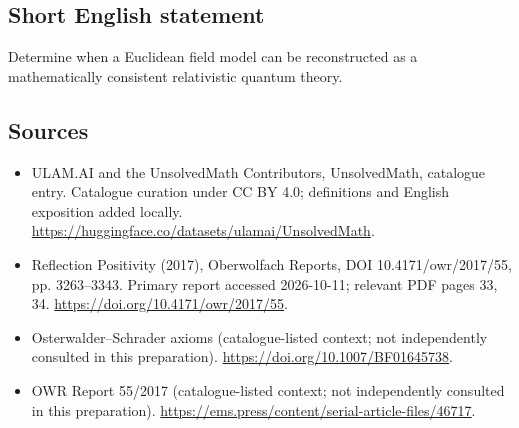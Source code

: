 \documentclass[11pt]{article}
\begin{document}
\subsection{Short English statement}
Determine when a Euclidean field model can be reconstructed as a mathematically consistent relativistic quantum theory.
\subsection{Sources}
\begin{itemize}
\item[\hypertarget{source:statement:1}{S1}] ULAM.AI and the UnsolvedMath Contributors, UnsolvedMath, catalogue entry. Catalogue curation under CC BY 4.0; definitions and English exposition added locally.
\url{https://huggingface.co/datasets/ulamai/UnsolvedMath}.
\item[\hypertarget{source:statement:2}{S2}] Reflection Positivity (2017), Oberwolfach Reports, DOI 10.4171/owr/2017/55, pp. 3263--3343. Primary report accessed 2026-10-11; relevant PDF pages 33, 34.
\url{https://doi.org/10.4171/owr/2017/55}.
\item[\hypertarget{source:statement:3}{S3}] Osterwalder--Schrader axioms (catalogue-listed context; not independently consulted in this preparation).
\url{https://doi.org/10.1007/BF01645738}.
\item[\hypertarget{source:statement:4}{S4}] OWR Report 55/2017 (catalogue-listed context; not independently consulted in this preparation).
\url{https://ems.press/content/serial-article-files/46717}.
\end{itemize}
\label{end:statement}
\end{document}

